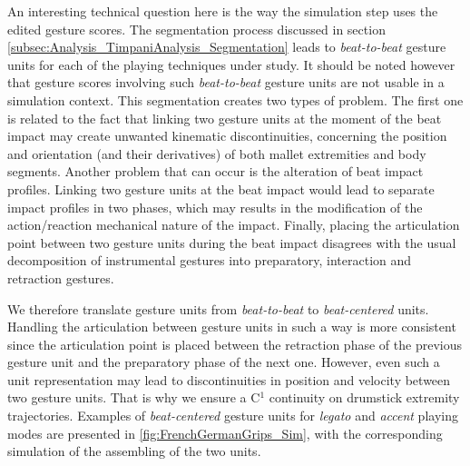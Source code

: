 An interesting technical question here is the way the simulation step uses the edited gesture scores. The segmentation process discussed in section \ref{subsec:Analysis_TimpaniAnalysis_Segmentation} leads to \emph{beat-to-beat} gesture units for each of the playing techniques under study. It should be noted however that gesture scores involving such \emph{beat-to-beat} gesture units are not usable in a simulation context. This segmentation creates two types of problem. The first one is related to the fact that linking two gesture units at the moment of the beat impact may create unwanted kinematic discontinuities, concerning the position and orientation (and their derivatives) of both mallet extremities and body segments. Another problem that can occur is the alteration of beat impact profiles. Linking two gesture units at the beat impact would lead to separate impact profiles in two phases, which may results in the modification of the action/reaction mechanical nature of the impact. Finally, placing the articulation point between two gesture units during the beat impact disagrees with the usual decomposition of instrumental gestures into preparatory, interaction and retraction gestures.


We therefore translate gesture units from \emph{beat-to-beat} to \emph{beat-centered} units. Handling the articulation between gesture units in such a way is more consistent since the articulation point is placed between the retraction phase of the previous gesture unit and the preparatory phase of the next one. However, even such a unit representation may lead to discontinuities in position and velocity between two gesture units. That is why we ensure a C$^1$ continuity on drumstick extremity trajectories. Examples of \emph{beat-centered} gesture units for \emph{legato} and \emph{accent} playing modes are presented in \myfigname \ref{fig:FrenchGermanGrips_Sim}, with the corresponding simulation of the assembling of the two units.\\

